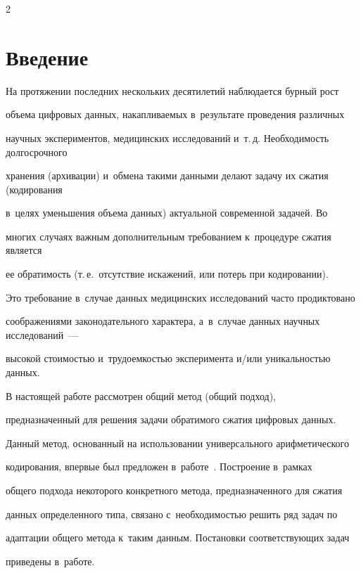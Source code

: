 \begin{multicols}{2}



\label{st\stat}



\section{Введение}




На протяжении последних нескольких десятилетий наблюдается бурный рост 

объема цифровых данных, накапливаемых в~результате проведения различных 

научных экспериментов, медицинских исследований и~т.\,д. Необходимость долгосрочного 

хранения (архивации) и~обмена такими данными делают задачу их сжатия (кодирования 

в~целях уменьшения объема данных) актуальной современной задачей. Во 

многих случаях важным дополнительным требованием к~процедуре сжатия является 

ее обратимость (т.\,е.\ отсутствие искажений, или потерь при кодировании). 

Это требование в~случае данных медицинских исследований часто продиктовано 

соображениями законодательного характера, а~в~случае данных научных исследований~--- 

высокой стоимостью и~трудоемкостью эксперимента и/или уникальностью данных.



В настоящей работе рассмотрен общий метод (общий подход), 

предназначенный для решения задачи обратимого сжатия цифровых данных. 

Данный метод, основанный на использовании универсального арифметического 

кодирования, впервые был предложен в~работе~\cite{b01}. Построение в~рамках 

общего подхода некоторого конкретного метода, предназначенного для сжатия 

данных определенного типа, связано с~необходимостью решить ряд задач по 

адаптации общего метода к~таким данным. Постановки соответствующих задач 

приведены в~работе.




\end{multicols}
